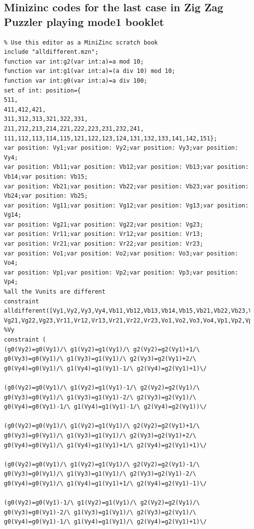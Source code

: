 \begin{appendices}
\section{Minizinc codes for the last case in Zig Zag Puzzler playing mode1 booklet}
\label{appendix:lastcaseinmode1}
\begin{lstlisting}
% Use this editor as a MiniZinc scratch book
include "alldifferent.mzn";
function var int:g2(var int:a)=a mod 10;
function var int:g1(var int:a)=(a div 10) mod 10;
function var int:g0(var int:a)=a div 100;
set of int: position={
511,
411,412,421,
311,312,313,321,322,331,
211,212,213,214,221,222,223,231,232,241,
111,112,113,114,115,121,122,123,124,131,132,133,141,142,151};
var position: Vy1;var position: Vy2;var position: Vy3;var position: Vy4;
var position: Vb11;var position: Vb12;var position: Vb13;var position: Vb14;var position: Vb15;
var position: Vb21;var position: Vb22;var position: Vb23;var position: Vb24;var position: Vb25;
var position: Vg11;var position: Vg12;var position: Vg13;var position: Vg14;
var position: Vg21;var position: Vg22;var position: Vg23;
var position: Vr11;var position: Vr12;var position: Vr13;
var position: Vr21;var position: Vr22;var position: Vr23;
var position: Vo1;var position: Vo2;var position: Vo3;var position: Vo4;
var position: Vp1;var position: Vp2;var position: Vp3;var position: Vp4;
%all the Vunits are different
constraint alldifferent([Vy1,Vy2,Vy3,Vy4,Vb11,Vb12,Vb13,Vb14,Vb15,Vb21,Vb22,Vb23,Vb24,Vb25,Vg11,Vg12,Vg13,Vg14,
Vg21,Vg22,Vg23,Vr11,Vr12,Vr13,Vr21,Vr22,Vr23,Vo1,Vo2,Vo3,Vo4,Vp1,Vp2,Vp3,Vp4]);
%Vy
constraint (
(g0(Vy2)=g0(Vy1)/\ g1(Vy2)=g1(Vy1)/\ g2(Vy2)=g2(Vy1)+1/\ g0(Vy3)=g0(Vy1)/\ g1(Vy3)=g1(Vy1)/\ g2(Vy3)=g2(Vy1)+2/\ g0(Vy4)=g0(Vy1)/\ g1(Vy4)=g1(Vy1)-1/\ g2(Vy4)=g2(Vy1)+1)\/ 

(g0(Vy2)=g0(Vy1)/\ g1(Vy2)=g1(Vy1)-1/\ g2(Vy2)=g2(Vy1)/\ g0(Vy3)=g0(Vy1)/\ g1(Vy3)=g1(Vy1)-2/\ g2(Vy3)=g2(Vy1)/\ g0(Vy4)=g0(Vy1)-1/\ g1(Vy4)=g1(Vy1)-1/\ g2(Vy4)=g2(Vy1))\/ 

(g0(Vy2)=g0(Vy1)/\ g1(Vy2)=g1(Vy1)/\ g2(Vy2)=g2(Vy1)+1/\ g0(Vy3)=g0(Vy1)/\ g1(Vy3)=g1(Vy1)/\ g2(Vy3)=g2(Vy1)+2/\ g0(Vy4)=g0(Vy1)/\ g1(Vy4)=g1(Vy1)+1/\ g2(Vy4)=g2(Vy1)+1)\/ 

(g0(Vy2)=g0(Vy1)/\ g1(Vy2)=g1(Vy1)/\ g2(Vy2)=g2(Vy1)-1/\ g0(Vy3)=g0(Vy1)/\ g1(Vy3)=g1(Vy1)/\ g2(Vy3)=g2(Vy1)-2/\ g0(Vy4)=g0(Vy1)/\ g1(Vy4)=g1(Vy1)+1/\ g2(Vy4)=g2(Vy1)-1)\/ 

(g0(Vy2)=g0(Vy1)-1/\ g1(Vy2)=g1(Vy1)/\ g2(Vy2)=g2(Vy1)/\ g0(Vy3)=g0(Vy1)-2/\ g1(Vy3)=g1(Vy1)/\ g2(Vy3)=g2(Vy1)/\ g0(Vy4)=g0(Vy1)-1/\ g1(Vy4)=g1(Vy1)/\ g2(Vy4)=g2(Vy1)+1)\/ 


\end{lstlisting}
\end{appendices}

